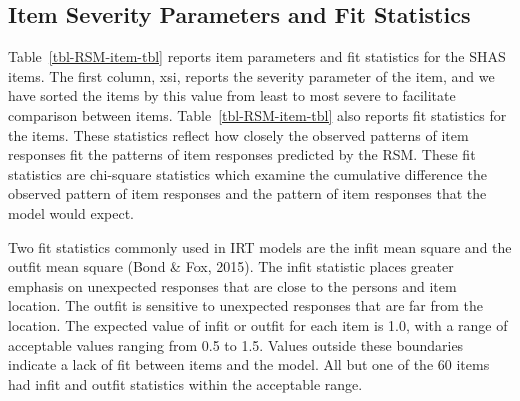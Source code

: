 \documentclass[
  letterpaper,
]{article}
\begin{document}
\subsection*{Item Severity Parameters and Fit
Statistics}\label{item-severity-parameters-and-fit-statistics}

Table~\ref{tbl-RSM-item-tbl} reports item parameters and fit statistics
for the SHAS items. The first column, xsi, reports the severity
parameter of the item, and we have sorted the items by this value from
least to most severe to facilitate comparison between items.
Table~\ref{tbl-RSM-item-tbl} also reports fit statistics for the items.
These statistics reflect how closely the observed patterns of item
responses fit the patterns of item responses predicted by the RSM. These
fit statistics are chi-square statistics which examine the cumulative
difference the observed pattern of item responses and the pattern of
item responses that the model would expect.

Two fit statistics commonly used in IRT models are the infit mean square
and the outfit mean square (Bond \& Fox, 2015). The infit statistic
places greater emphasis on unexpected responses that are close to the
persons and item location. The outfit is sensitive to unexpected
responses that are far from the location. The expected value of infit or
outfit for each item is 1.0, with a range of acceptable values ranging
from 0.5 to 1.5. Values outside these boundaries indicate a lack of fit
between items and the model. All but one of the 60 items had infit and
outfit statistics within the acceptable range.
\end{document}

